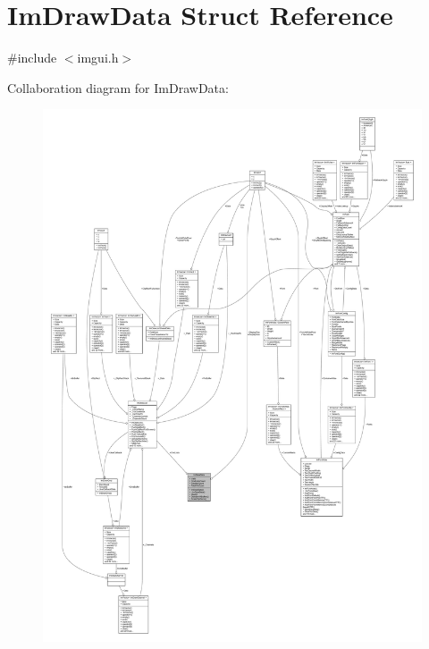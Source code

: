 \hypertarget{struct_im_draw_data}{}\section{Im\+Draw\+Data Struct Reference}
\label{struct_im_draw_data}


{\ttfamily \#include $<$imgui.\+h$>$}



Collaboration diagram for Im\+Draw\+Data\+:
\nopagebreak
\begin{figure}[H]
\begin{center}
\leavevmode
\includegraphics[width=350pt]{struct_im_draw_data__coll__graph}
\end{center}
\end{figure}
